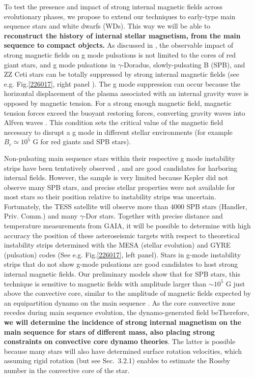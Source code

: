 To test the presence and impact of strong internal magnetic fields across evolutionary phases,
we propose to extend our techniques to early-type main sequence stars and white dwarfs (WDs). This way we will be able to \textbf{reconstruct the history of internal stellar magnetism, from the main sequence to compact objects.} As discussed in \citet{Cantiello_2016}, the observable impact of strong magnetic fields on g mode pulsations is not limited to the cores of red giant stars, and g mode pulsations in $\gamma$-Doradus, slowly-pulsating B (SPB), and ZZ Ceti stars can be totally suppressed by strong internal magnetic fields (see e.g. Fig.\ref{226017}, right panel ). The g mode suppression can occur because the horizontal displacement of the plasma associated with an internal gravity wave is opposed by magnetic tension. For a strong enough magnetic field, magnetic tension forces exceed the buoyant restoring forces, converting gravity waves into Alfven waves \cite{lecoanet:17}. This condition sets the critical value of the magnetic field necessary to disrupt a g mode in different stellar environments (for example $B_c \simeq 10^5$ G for red giants and SPB stars). 

Non-pulsating main sequence stars within their respective g mode instability strips have been tentatively observed \citep{Balona_2011}, and are good candidates for harboring internal fields.
However, the sample is very limited because Kepler did not observe many SPB stars, and precise stellar properties were not available for most stars so their position relative to instability strips was uncertain. Fortunately, the TESS satellite will observe more than 4000 SPB stars (Handler, Priv. Comm.) and many $\gamma$-Dor stars. Together with precise distance and temperature measurements from GAIA, it will be possible to determine with high accuracy the position of these asteroseismic targets with respect to theoretical instability strips determined with the MESA (stellar evolution) and GYRE (pulsation) codes (See e.g. Fig.\ref{226017}, left panel). Stars in g-mode instability strips that do not show g-mode pulsations are good candidates to host strong internal magnetic fields. Our preliminary models show that for SPB stars, this technique is sensitive to magnetic fields with amplitude larger than $\sim \! 10^5$ G just above the convective core, similar to the amplitude of magnetic fields expected by an equipartition dynamo on the main sequence \citep[See e.g.][]{Featherstone_2009,Augustson_2016}. As the core convective zone recedes during main sequence evolution, the dynamo-generated field beTherefore, \textbf{we will determine the incidence of strong internal magnetism on the main sequence for stars of different mass, also placing strong constraints on convective core dynamo theories}. The latter is possible because many stars will also have determined surface rotation velocities, which assuming rigid rotation (but see Sec.~3.2.1) enables to estimate the Rossby number in the convective core of the star.

